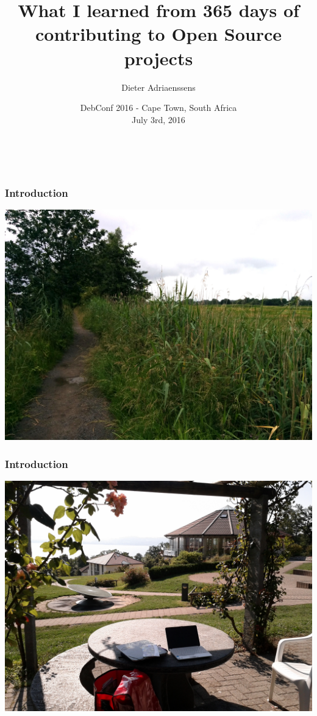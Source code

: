 \documentclass[14pt]{beamer}
\title[365 days of Open Source]{What I learned from 365 days of contributing to Open Source projects}
\author{Dieter Adriaenssens}
\institute[]{Open Source developer - @dcadriaenssens}
\date[DebConf16 3Jul2016]{DebConf 2016 - Cape Town, South Africa\\
July 3rd, 2016}
\begin{document}
  \begin{frame}
    \titlepage
    \vfill
    \begin{center}
      \\[2.5ex]
        {\tiny\CcNote{\CcLongnameByNcSa}}
        \vspace*{-2.5ex}
    \end{center}
  \end{frame}
  \begin{frame}
    \frametitle{Introduction}
    \includegraphics[scale=.1]{Bourgoyen.jpg}
  \end{frame}
  \begin{frame}
    \frametitle{Introduction}
    \includegraphics[scale=.125]{DebConf2013.jpg}
  \end{frame}
\end{document}
